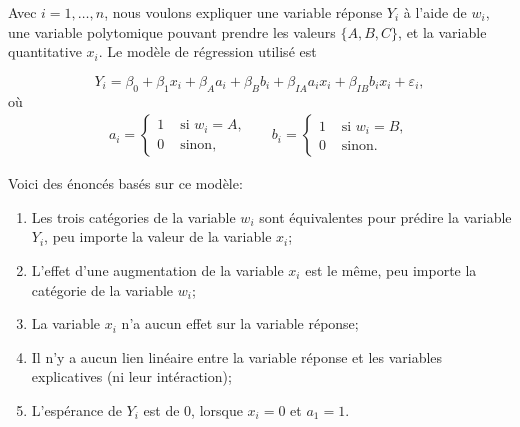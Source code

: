 \begin{questions}


\newpage
\question\label{interactionEThypotheses}
Avec $i=1,\hdots,n$, nous voulons expliquer une variable réponse $Y_i$ à l'aide de $w_i$, une variable polytomique pouvant prendre les valeurs $\{A,B,C\}$, et la variable quantitative $x_i$. Le modèle de régression utilisé est 

\begin{equation}\label{eq:modeleInteraction}
    Y_i=\beta_0 + \beta_1 x_i + \beta_{A} a_{i} + \beta_B b_i + \beta_{IA}a_i x_i+ \beta_{IB}b_i x_i + \varepsilon_i,
\end{equation}
où 
\begin{align*}
    a_i =\left\{
			\begin{array}{ll}
			1  & \mbox{ si } w_i=A, \\
			0 & \mbox{ sinon, }
   \end{array}
			\right. & & b_i =\left\{
			\begin{array}{ll}
			1  & \mbox{ si } w_i=B, \\
			0 & \mbox{ sinon. }
   \end{array}
			\right. 
\end{align*}

Voici des énoncés basés sur ce modèle:

\begin{enumerate}
    \item Les trois catégories de la variable $w_i$ sont équivalentes pour prédire la variable $Y_i$, peu importe la valeur de la variable $x_i$;
    \item L'effet d'une augmentation de la variable $x_i$ est le même, peu importe la catégorie de la variable $w_i$;
    \item La variable $x_i$ n'a aucun effet sur la variable réponse;
    \item Il n'y a aucun lien linéaire entre la variable réponse et les variables explicatives (ni leur intéraction); 
    \item L'espérance de $Y_i$ est de $0$, lorsque $x_i=0$ et $a_1=1$.
\end{enumerate}


\end{questions}
